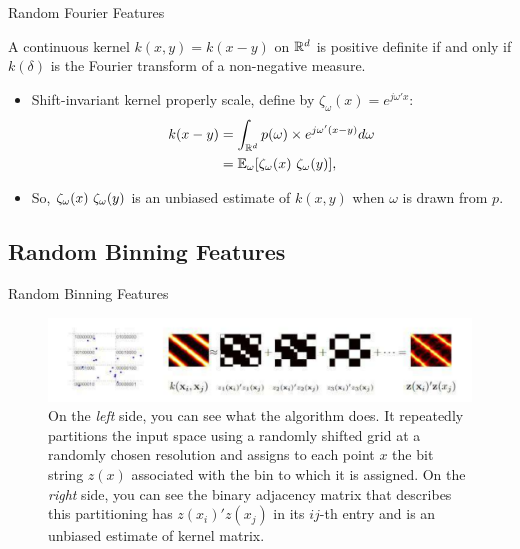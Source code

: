 \documentclass[unknownkeysallowed]{beamer}
\begin{document}
\begin{frame}{Random Fourier Features}

\begin{theorem}[Bochner]
A continuous kernel $k(x,y) = k(x - y)$ on $\mathbb{R}^d$ is positive definite if and only if $k(\delta)$ is the Fourier transform of a non-negative measure.
\end{theorem}
\begin{itemize}
    \item Shift-invariant kernel properly scale, define by $\zeta_{\omega}(x) = e^{j\omega'x}$:
\begin{align*}
k(x-y) &= \int_{\bbR^d} p(\omega) \times e^{j\omega'(x-y)}d\omega \\
           &= \bbE_{\omega}[\zeta_{\omega}(x) \ \zeta_{\omega}(y)\*],
\end{align*}
   \item So,  $\zeta_{\omega}(x) \ \zeta_{\omega}(y)\*$ is an unbiased estimate of $k(x,y)$ when $\omega$ is drawn from $p$.
\end{itemize}
\end{frame}


\subsection{Random Binning Features}
\label{sub:Random Binning Features}

\begin{frame}{Random Binning Features}

\begin{figure}[h!]
    \centering
    \includegraphics[scale=0.6]{images/Radom_binning_features.pdf}
    \caption{On the \textit{left} side, you can see what the algorithm does. It repeatedly partitions the input space using a randomly shifted grid at a randomly chosen resolution and assigns to each point $x$ the bit string $z(x)$ associated with the bin to which it is assigned. On the \textit{right} side, you can see the binary adjacency matrix that describes this partitioning has $z(x_i)'z(x_j)$ in its $ij$-th entry and is an unbiased estimate of kernel matrix.}
    \label{Random_shift_grids}
\end{figure}


\end{frame}
\end{document}
